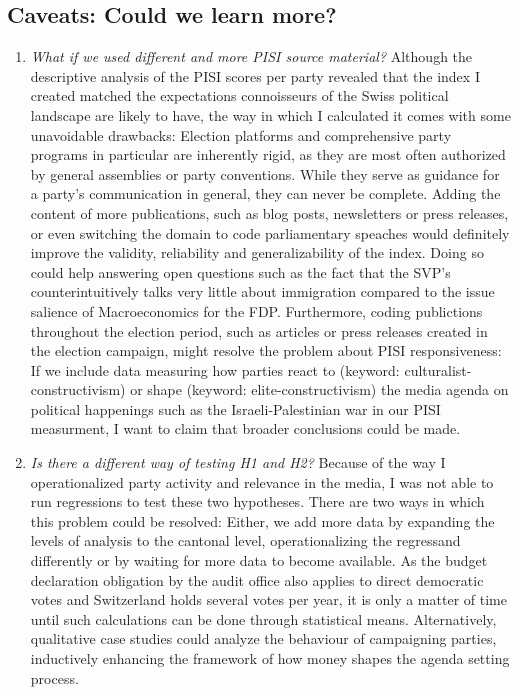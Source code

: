 \documentclass[11pt,a4paper]{article}
\begin{document}
\subsection{Caveats: Could we learn more?}
\begin{enumerate}
    \item \textit{What if we used different and more PISI source material?} Although the descriptive analysis of the PISI scores per party revealed that the index I created matched the expectations connoisseurs of the Swiss political landscape are likely to have, the way in which I calculated it comes with some unavoidable drawbacks: Election platforms and comprehensive party programs in particular are inherently rigid, as they are most often authorized by general assemblies or party conventions. While they serve as guidance for a party’s communication in general, they can never be complete. Adding the content of more publications, such as blog posts, newsletters or press releases, or even switching the domain to code parliamentary speaches would definitely improve the validity, reliability and generalizability of the index. Doing so could help answering open questions such as the fact that the SVP’s counterintuitively talks very little about immigration compared to the issue salience of Macroeconomics for the FDP. Furthermore, coding publictions throughout the election period, such as articles or press releases created in the election campaign, might resolve the problem about PISI responsiveness: If we include data measuring how parties react to (keyword: culturalist-constructivism) or shape (keyword: elite-constructivism) the media agenda on political happenings such as the Israeli-Palestinian war in our PISI measurment, I want to claim that broader conclusions could be made.

    \item  \textit{Is there a different way of testing H1 and H2?} Because of the way I operationalized party activity and relevance in the media, I was not able to run regressions to test these two hypotheses. There are two ways in which this problem could be resolved: Either, we add more data by expanding the levels of analysis to the cantonal level, operationalizing the regressand differently or by waiting for more data to become available. As the budget declaration obligation by the audit office also applies to direct democratic votes and Switzerland holds several votes per year, it is only a matter of time until such calculations can be done through statistical means. Alternatively, qualitative case studies could analyze the behaviour of campaigning parties, inductively enhancing the framework of how money shapes the agenda setting process.


\end{enumerate}
\end{document}

